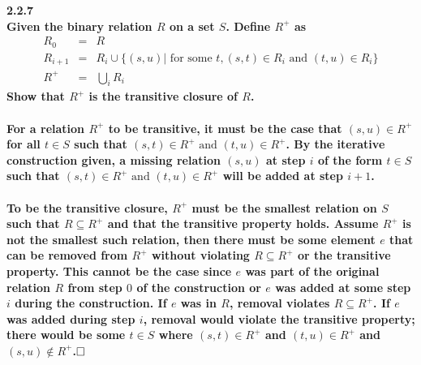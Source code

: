 \documentclass[12pt,letterpaper]{article}
\newcommand{\hwSect}[1] {\noindent\large\bf#1\rm\normalsize}
\newcommand{\done}{$\hfill\square$}
\begin{document}
\hwSect{2.2.7}\\
Given the binary relation $R$ on a set $S$. Define $R^+$ as 
\begin{eqnarray*}
R_0 &=& R \\
R_{i+1} &=& R_i \cup \{(s,u) | \text{ for some } t, (s,t) \in R_i \text{ and } (t,u) \in R_i\} \\
R^+ &=& \bigcup_i R_i
\end{eqnarray*}
Show that $R^+$ is the transitive closure of $R$.\\ \\
For a relation $R^+$ to be transitive, it must be the case that $(s,u) \in R^+$ for all $t \in S$ such that $(s,t) \in R^+ \text{ and } (t,u) \in R^+$. By the iterative construction given, a missing relation $(s,u)$ at step $i$ of the form $t \in S$ such that $(s,t) \in R^+ \text{ and } (t,u) \in R^+$ will be added at step $i+1$.\\ \\
To be the transitive closure, $R^+$ must be the smallest relation on $S$ such that $R \subseteq R^+$ and that the transitive property holds. Assume $R^+$ is not the smallest such relation, then there must be some element $e$ that can be removed from $R^+$ without violating $R \subseteq R^+$ or the transitive property. This cannot be the case since $e$ was part of the original relation $R$ from step $0$ of the construction or $e$ was added at some step $i$ during the construction. If $e$ was in $R$, removal violates $R \subseteq R^+$. If $e$ was added during step $i$, removal would violate the transitive property; there would be some $t \in S$ where $(s,t) \in R^+$ and $(t,u) \in R^+$ and $(s,u) \not\in R^+$.\done\\ \\

\begin{comment}
We need to show that R+ really is the transitive closure.  The transitive closure means that for all s,t,u in S, if (s,t) and (t,u) are in R then (s,u) is also in R.

At each iterative step, we only add elements that are applications of the transitive property.  If we remove an element then we are either removing from R or removing from R tran.

How can we be guaranteed that we have everything?  R+ is the union of all transitive edges that we can possible add. If there was a missing transitive edge then we are not yet at R+.

BTW we know that R+ terminates because i must be less than or equal to the cardinality of the set S.
\end{comment}
\end{document}
